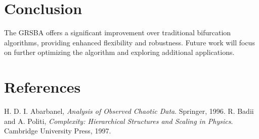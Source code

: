 \documentclass{article}
\begin{document}
\section{Conclusion}
The GRSBA offers a significant improvement over traditional bifurcation algorithms, providing enhanced flexibility and robustness. Future work will focus on further optimizing the algorithm and exploring additional applications.

\section{References}
\begin{thebibliography}{9}
     H. D. I. Abarbanel, \textit{Analysis of Observed Chaotic Data}. Springer, 1996.
     R. Badii and A. Politi, \textit{Complexity: Hierarchical Structures and Scaling in Physics}. Cambridge University Press, 1997.
\end{thebibliography}
\end{document}
